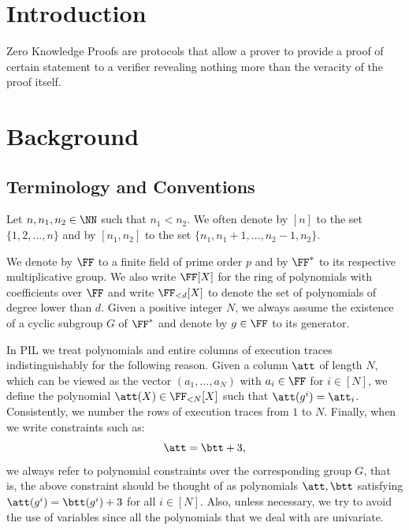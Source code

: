 
\section{Introduction}

Zero Knowledge Proofs are protocols that allow a prover to provide a proof of certain statement to a verifier revealing nothing more than the veracity of the proof itself.





\section{Background}

\subsection{Terminology and Conventions}

Let $n,n_1,n_2 \in \NN$ such that $n_1 < n_2$. We often denote by $[n]$ to the set $\{1,2,\dots, n\}$ and by $[n_1,n_2]$ to the set $\{n_1, n_1+1, \dots, n_2 - 1, n_2\}$.

We denote by $\FF$ to a finite field of prime order $p$ and by $\FF^*$ to its respective multiplicative group. We also write $\FF[X]$ for the ring of polynomials with coefficients over $\FF$ and write $\FF_{<d}[X]$ to denote the set of polynomials of degree lower than $d$. Given a positive integer $N$, we always assume the existence of a cyclic subgroup $G$ of $\FF^*$ and denote by $g \in \FF$ to its generator.

In PIL we treat polynomials and entire columns of execution traces indistinguishably for the following reason. Given a column $\att$ of length $N$, which can be viewed as the vector $(a_1,\dots,a_N)$ with $a_i \in \FF$ for $i \in [N]$, we define the polynomial $\att(X) \in \FF_{<N}[X]$ such that $\att(g^i) = \att_i$. Consistently, we number the rows of execution traces from $1$ to $N$. Finally, when we write constraints such as:
\[
  \att = \btt + 3,  
\]
we always refer to polynomial constraints over the corresponding group $G$, that is, the above constraint should be thought of as polynomials $\att,\btt$ satisfying $\att(g^i) = \btt(g^i) + 3$ for all $i \in [N]$. Also, unless necessary, we try to avoid the use of variables since all the polynomials that we deal with are univariate. 

